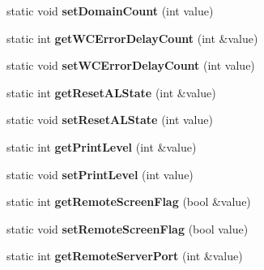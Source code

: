 \begin{DoxyCompactItemize}
\item 
\hypertarget{classAppConf_aeb0c4dcc3b29b65270ac4fa49049d1c9}{static void {\bfseries set\-Domain\-Count} (int value)}\label{classAppConf_aeb0c4dcc3b29b65270ac4fa49049d1c9}

\item 
\hypertarget{classAppConf_a08bd11319efcfb78b201ef1a222cc6fe}{static int {\bfseries get\-W\-C\-Error\-Delay\-Count} (int \&value)}\label{classAppConf_a08bd11319efcfb78b201ef1a222cc6fe}

\item 
\hypertarget{classAppConf_a53f168cb9ed3100ee32dfb57c9c9020a}{static void {\bfseries set\-W\-C\-Error\-Delay\-Count} (int value)}\label{classAppConf_a53f168cb9ed3100ee32dfb57c9c9020a}

\item 
\hypertarget{classAppConf_a627ad59a33ae20c559d8eb9672696ee5}{static int {\bfseries get\-Reset\-A\-L\-State} (int \&value)}\label{classAppConf_a627ad59a33ae20c559d8eb9672696ee5}

\item 
\hypertarget{classAppConf_a553aa641c1cf4ad08b0c871b16f0121b}{static void {\bfseries set\-Reset\-A\-L\-State} (int value)}\label{classAppConf_a553aa641c1cf4ad08b0c871b16f0121b}

\item 
\hypertarget{classAppConf_a50854ec2bb765daedd39003f2378d260}{static int {\bfseries get\-Print\-Level} (int \&value)}\label{classAppConf_a50854ec2bb765daedd39003f2378d260}

\item 
\hypertarget{classAppConf_a0ad2e03037522565e0487e65938223bc}{static void {\bfseries set\-Print\-Level} (int value)}\label{classAppConf_a0ad2e03037522565e0487e65938223bc}

\item 
\hypertarget{classAppConf_a16fac39e89fe89d445ded7081ffe9894}{static int {\bfseries get\-Remote\-Screen\-Flag} (bool \&value)}\label{classAppConf_a16fac39e89fe89d445ded7081ffe9894}

\item 
\hypertarget{classAppConf_af420a9146d55cc8ce826aadb660fa667}{static void {\bfseries set\-Remote\-Screen\-Flag} (bool value)}\label{classAppConf_af420a9146d55cc8ce826aadb660fa667}

\item 
\hypertarget{classAppConf_af1c980c9eadfde25db11dc884418e9c0}{static int {\bfseries get\-Remote\-Server\-Port} (int \&value)}\label{classAppConf_af1c980c9eadfde25db11dc884418e9c0}


\end{DoxyCompactItemize}
